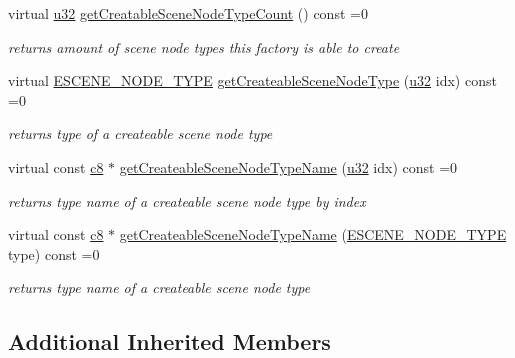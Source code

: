 \begin{DoxyCompactItemize}
\mbox{\label{classirr_1_1scene_1_1ISceneNodeFactory_a3c1be487fb0169ee9fbb7169c451d16e}} 
virtual \hyperlink{namespaceirr_a0416a53257075833e7002efd0a18e804}{u32} \hyperlink{classirr_1_1scene_1_1ISceneNodeFactory_a3c1be487fb0169ee9fbb7169c451d16e}{get\+Creatable\+Scene\+Node\+Type\+Count} () const =0
\begin{DoxyCompactList}\small\item\em returns amount of scene node types this factory is able to create \end{DoxyCompactList}\item 
virtual \hyperlink{namespaceirr_1_1scene_acad3d7ef92a9807d391ba29120f3b7bd}{E\+S\+C\+E\+N\+E\+\_\+\+N\+O\+D\+E\+\_\+\+T\+Y\+PE} \hyperlink{classirr_1_1scene_1_1ISceneNodeFactory_aaff4e3d3dc214ec83965ecbd8e8175a3}{get\+Createable\+Scene\+Node\+Type} (\hyperlink{namespaceirr_a0416a53257075833e7002efd0a18e804}{u32} idx) const =0
\begin{DoxyCompactList}\small\item\em returns type of a createable scene node type \end{DoxyCompactList}\item 
virtual const \hyperlink{namespaceirr_a9395eaea339bcb546b319e9c96bf7410}{c8} $\ast$ \hyperlink{classirr_1_1scene_1_1ISceneNodeFactory_a259f156cc367a9a89f79159ad2b665ac}{get\+Createable\+Scene\+Node\+Type\+Name} (\hyperlink{namespaceirr_a0416a53257075833e7002efd0a18e804}{u32} idx) const =0
\begin{DoxyCompactList}\small\item\em returns type name of a createable scene node type by index \end{DoxyCompactList}\item 
virtual const \hyperlink{namespaceirr_a9395eaea339bcb546b319e9c96bf7410}{c8} $\ast$ \hyperlink{classirr_1_1scene_1_1ISceneNodeFactory_addc09a5ab7a8d8b65182fbaa09c88b6f}{get\+Createable\+Scene\+Node\+Type\+Name} (\hyperlink{namespaceirr_1_1scene_acad3d7ef92a9807d391ba29120f3b7bd}{E\+S\+C\+E\+N\+E\+\_\+\+N\+O\+D\+E\+\_\+\+T\+Y\+PE} type) const =0
\begin{DoxyCompactList}\small\item\em returns type name of a createable scene node type \end{DoxyCompactList}\end{DoxyCompactItemize}
\subsection*{Additional Inherited Members}


